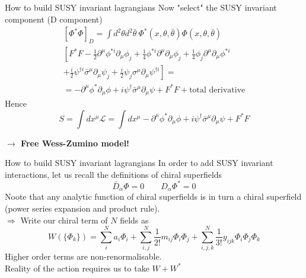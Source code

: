 \documentclass[10pt]{beamer}
\begin{document}
\begin{frame}{How to build SUSY invariant lagrangians}
    Now "select" the SUSY invariant component (D component)
    \begin{gather*}
        \left[\Phi^*\Phi\right]_D = \int d^2\theta d^2\bar\theta \ \Phi^*(x, \theta, \bar\theta) \Phi(x, \theta, \bar\theta) \\
        \left[F^* F - \frac{1}{2} \partial^{\mu} \phi^{* i} \partial_{\mu} \phi_{j}+\frac{1}{4} \phi^{* i} \partial^{\mu} \partial_{\mu} \phi_{j}+\frac{1}{4} \phi_{j} \partial^{\mu} \partial_{\mu} \phi^{* i}\right. \\
                \left.+\frac{i}{2} \psi^{\dagger i} \bar{\sigma}^{\mu} \partial_{\mu} \psi_{j}+\frac{i}{2} \psi_{j} \sigma^{\mu} \partial_{\mu} \psi^{\dagger i}\right] = \\
        = -\partial^{\mu}\phi^*\partial_{\mu}\phi + i\psi^{\dagger}\bar\sigma^{\mu}\partial_{\mu}\psi + F^*F + \text{total derivative}
    \end{gather*}
    Hence 
    \begin{equation*}
        \boxed{S = \int dx^{\mu} \mathcal{L} = \int dx^{\mu} -\partial^{\mu}\phi^*\partial_{\mu}\phi + i\psi^{\dagger}\bar\sigma^{\mu}\partial_{\mu}\psi + F^*F}
    \end{equation*}
    \centerline{\bfseries $\rightarrow$ Free Wess-Zumino model!}
\end{frame}

\begin{frame}{How to build SUSY invariant lagrangians}
    In order to add SUSY invariant interactions, let us recall the definitions of chiral superfields 
    \begin{equation*}
        \bar D_{\dot\alpha} \Phi = 0 \qquad D_{\alpha} \Phi^* = 0
    \end{equation*}
        Noote that any analytic function of chiral superfields is in turn a chiral superfield (power series expansion and product rule). \\
        $\Rightarrow$ Write our chiral term of $N$ fields as 
        \begin{equation*}
            W(\{\Phi_k\}) = \sum_i^N a_i \Phi_i + \sum_{i,j}^N \frac{1}{2!} m_{ij} \Phi_{i}\Phi_j + \sum_{i,j,k}^N \frac{1}{3!} y_{ijk} \Phi_i \Phi_j \Phi_k
        \end{equation*}
        Higher order terms are non-renormalisable. \\
        Reality of the action requires us to take $W + W^*$
    
\end{frame}
\end{document}
